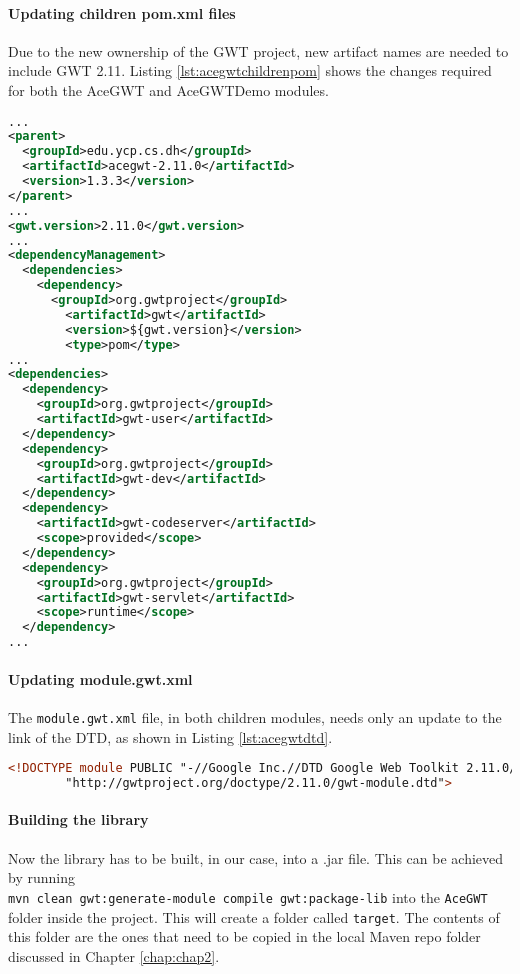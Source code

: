 \paragraph{Updating children pom.xml files}
Due to the new ownership of the GWT project, new artifact names are needed to include GWT 2.11. Listing \ref{lst:acegwtchildrenpom} shows the changes required for both the AceGWT and AceGWTDemo modules.
\begin{lstlisting}[float, language=XML, label={lst:acegwtchildrenpom}, caption={The changes to the children's pom.xml}]
...
<parent>
  <groupId>edu.ycp.cs.dh</groupId>
  <artifactId>acegwt-2.11.0</artifactId>
  <version>1.3.3</version>
</parent>
...
<gwt.version>2.11.0</gwt.version>
...
<dependencyManagement>
  <dependencies>
    <dependency>
      <groupId>org.gwtproject</groupId>
        <artifactId>gwt</artifactId>
        <version>${gwt.version}</version>
        <type>pom</type>
...
<dependencies>
  <dependency>
    <groupId>org.gwtproject</groupId>
    <artifactId>gwt-user</artifactId>
  </dependency>
  <dependency>
    <groupId>org.gwtproject</groupId>
    <artifactId>gwt-dev</artifactId>
  </dependency>
  <dependency>
    <artifactId>gwt-codeserver</artifactId>
    <scope>provided</scope>
  </dependency>
  <dependency>
    <groupId>org.gwtproject</groupId>
    <artifactId>gwt-servlet</artifactId>
    <scope>runtime</scope>
  </dependency>
...
\end{lstlisting}
\paragraph{Updating module.gwt.xml}
The \verb|module.gwt.xml| file, in both children modules, needs only an update to the link of the DTD, as shown in Listing \ref{lst:acegwtdtd}.
\begin{lstlisting}[float, language=XML, label={lst:acegwtdtd}, caption={Updated DTD version}]
<!DOCTYPE module PUBLIC "-//Google Inc.//DTD Google Web Toolkit 2.11.0//EN"
        "http://gwtproject.org/doctype/2.11.0/gwt-module.dtd">
\end{lstlisting}
\paragraph{Building the library}
Now the library has to be built, in our case,  into a .jar file. This can be achieved by running\\ \verb|mvn clean gwt:generate-module compile gwt:package-lib| into the \verb|AceGWT| folder inside the project. This will create a folder called \verb|target|. The contents of this folder are the ones that need to be copied in the local Maven repo folder discussed in Chapter \ref{chap:chap2}.
